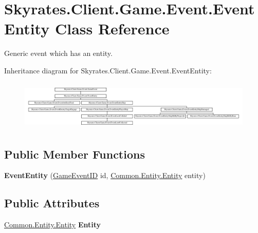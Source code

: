 \hypertarget{class_skyrates_1_1_client_1_1_game_1_1_event_1_1_event_entity}{\section{Skyrates.\-Client.\-Game.\-Event.\-Event\-Entity Class Reference}
\label{class_skyrates_1_1_client_1_1_game_1_1_event_1_1_event_entity}
}


Generic event which has an entity.  


Inheritance diagram for Skyrates.\-Client.\-Game.\-Event.\-Event\-Entity\-:\begin{figure}[H]
\begin{center}
\leavevmode
\includegraphics[height=2.386364cm]{class_skyrates_1_1_client_1_1_game_1_1_event_1_1_event_entity}
\end{center}
\end{figure}
\subsection*{Public Member Functions}
\begin{DoxyCompactItemize}
\item 
\hypertarget{class_skyrates_1_1_client_1_1_game_1_1_event_1_1_event_entity_a8510c0be0f900d65b6b106ca3ad6b5b9}{{\bfseries Event\-Entity} (\hyperlink{namespace_skyrates_1_1_client_1_1_game_1_1_event_a3a7e5dc62ad299d5e53abb4a3e5d5088}{Game\-Event\-I\-D} id, \hyperlink{class_skyrates_1_1_common_1_1_entity_1_1_entity}{Common.\-Entity.\-Entity} entity)}\label{class_skyrates_1_1_client_1_1_game_1_1_event_1_1_event_entity_a8510c0be0f900d65b6b106ca3ad6b5b9}

\end{DoxyCompactItemize}
\subsection*{Public Attributes}
\begin{DoxyCompactItemize}
\item 
\hypertarget{class_skyrates_1_1_client_1_1_game_1_1_event_1_1_event_entity_ac71d6a532f510ff94d9ff1a0407d48f8}{\hyperlink{class_skyrates_1_1_common_1_1_entity_1_1_entity}{Common.\-Entity.\-Entity} {\bfseries Entity}}\label{class_skyrates_1_1_client_1_1_game_1_1_event_1_1_event_entity_ac71d6a532f510ff94d9ff1a0407d48f8}

\end{DoxyCompactItemize}


